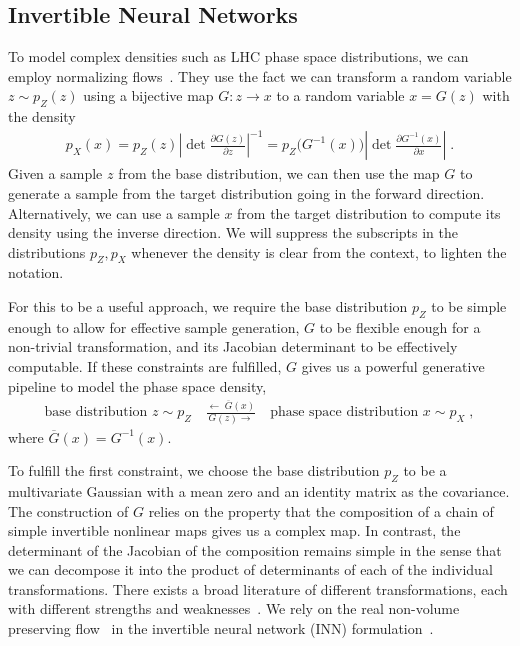 \subsection{Invertible Neural Networks}
\label{sec:nets_inn}

To model complex densities such as LHC phase space distributions, we
can employ normalizing
flows~\cite{nflow1,coupling2,glow,nflow_review}. They use the fact we
can transform a random variable $z\sim p_Z(z)$ using a bijective map
$G:z\to x$ to a random variable $x = G(z)$ with the density
%
\begin{align}
    p_X(x) = p_Z(z) \left|\det \frac{\partial G(z)}{\partial z}\right|^{-1} = p_Z\big(G^{-1}(x)\big)\left|\det\frac{\partial G^{-1}(x)}{\partial x}\right|\; .\label{eq:cov}
\end{align}
%
Given a sample $z$ from the base distribution, we can then use the map
$G$ to generate a sample from the target distribution going in the
forward direction. Alternatively, we can use a sample $x$ from the
target distribution to compute its density using the inverse
direction. We will suppress the subscripts in the distributions
$p_Z,p_X$ whenever the density is clear from the context, to lighten
the notation.

For this to be a useful approach, we require the base distribution
$p_Z$ to be simple enough to allow for effective sample generation,
$G$ to be flexible enough for a non-trivial transformation, and its
Jacobian determinant to be effectively computable. If these
constraints are fulfilled, $G$ gives us a powerful generative pipeline
to model the phase space density,
%
\begin{align}
\text{base distribution $z \sim p_Z$} \quad
\frac{\leftarrow \; \overline{G}(x)}{G(z) \rightarrow} \quad
\text{phase space distribution $x \sim p_X$} \;,
\label{eq:mapping}
\end{align}
%
where $\overline{G}(x) = G^{-1}(x)$.%

To fulfill the first constraint, we choose the base distribution $p_Z$
to be a multivariate Gaussian with a mean zero and an identity matrix
as the covariance.  The construction of $G$ relies on the property
that the composition of a chain of simple invertible nonlinear maps
gives us a complex map. In contrast, the determinant of the Jacobian
of the composition remains simple in the sense that we can decompose
it into the product of determinants of each of the individual
transformations.  There exists a broad literature of different
transformations, each with different strengths and
weaknesses~\cite{nflow_review}. We rely on the real non-volume
preserving flow~\cite{coupling2} in the invertible neural network
(INN) formulation~\cite{inn}.

